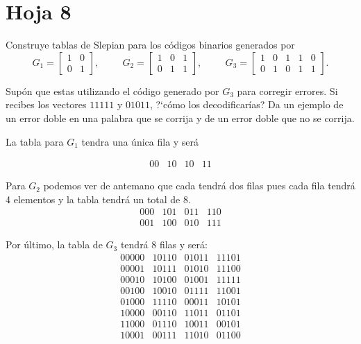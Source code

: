 \section{Hoja 8}
\begin{problem}[1]
\ppart Construye tablas de Slepian para los códigos binarios generados
por
\[
G_1=\left[\begin{array}{cc} 1&0\\0&1 \end{array}\right],
\hspace{1cm}
G_2=\left[\begin{array}{ccc} 1&0&1\\0&1&1 \end{array}\right],
\hspace{1cm}
G_3=\left[\begin{array}{ccccc} 1&0&1&1&0\\0&1&0&1&1
\end{array}\right].
\]

\ppart Supón que estas utilizando el código generado por $G_3$ para
corregir errores. Si recibes los vectores $11111$ y $01011$,
?`cómo los decodificarías? Da un ejemplo de un error doble en una
palabra que se corrija y de un error doble que no se corrija.

\solution


\spart

La tabla para $G_1$ tendra una única fila y será

\[\begin{array}{cccc}
00 & 10 & 10 & 11
\end{array}\]

Para $G_2$ podemos ver de antemano que cada tendrá dos filas pues cada fila tendrá 4 elementos y la tabla tendrá un total de 8.
\[\begin{array}{cccc}
000 & 101 & 011 & 110 \\
001 & 100 & 010 & 111
\end{array}\]

Por último, la tabla de $G_3$ tendrá 8 filas y será:
\[\begin{array}{cccc}
00000 & 10110 & 01011 & 11101 \\
00001 & 10111 & 01010 & 11100 \\
00010 & 10100 & 01001 & 11111 \\
00100 & 10010 & 01111 & 11001 \\
01000 & 11110 & 00011 & 10101 \\
10000 & 00110 & 11011 & 01101 \\
11000 & 01110 & 10011 & 00101 \\
10001 & 00111 & 11010 & 01100
\end{array}\]


\end{problem}
